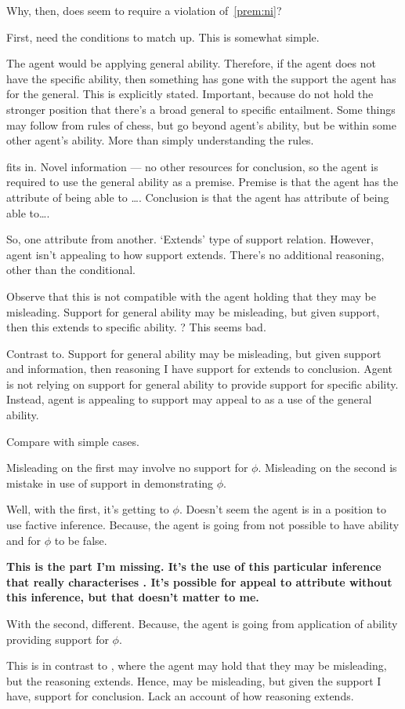 \begin{note}
  Why, then, does \AR{} seem to require a violation of~\ref{prem:ni}?

  First, need the conditions to match up.
  This is somewhat simple.

  The agent would be applying general ability.
  Therefore, if the agent does not have the specific ability, then something has gone with the support the agent has for the general.
  This is explicitly stated.
  Important, because do not hold the stronger position that there's a broad general to specific entailment.
  Some things may follow from rules of chess, but go beyond agent's ability, but be within some other agent's ability.
  More than simply understanding the rules.

  \AR{} fits in.
  Novel information --- no other resources for conclusion, so the agent is required to use the general ability as a premise.
  Premise is that the agent has the attribute of being able to \dots.
  Conclusion is that the agent has attribute of being able to\dots.

  So, one attribute from another.
  `Extends' type of support relation.
  However, agent isn't appealing to how support extends.
  There's no additional reasoning, other than the conditional.

  Observe that this is not compatible with the agent holding that they may be misleading.
  Support for general ability may be misleading, but given support, then this extends to specific ability.
  ? This seems bad.

  Contrast to.
  Support for general ability may be misleading, but given support and information, then reasoning I have support for extends to conclusion.
  Agent is not relying on support for general ability to provide support for specific ability.
  Instead, agent is appealing to support may appeal to as a use of the general ability.

  Compare with simple cases.
  


  Misleading on the first may involve no support for \(\phi\).
  Misleading on the second is mistake in use of support in demonstrating \(\phi\).
  {
    \color{green}
    Well, with the first, it's getting to \(\phi\).
    Doesn't seem the agent is in a position to use factive inference.
    Because, the agent is going from not possible to have ability and for \(\phi\) to be false.

    \textbf{
      This is the part I'm missing.
      It's the use of this particular inference that really characterises \AR{}.
      It's possible for appeal to attribute without this inference, but that doesn't matter to me.
    }

    With the second, different.
    Because, the agent is going from application of ability providing support for \(\phi\).
  }

  {
    \color{red}
    This is in contrast to \WR{}, where the agent may hold that they may be misleading, but the reasoning extends.
    Hence, may be misleading, but given the support I have, support for conclusion.
    Lack an account of how reasoning extends.
  }
\end{note}

